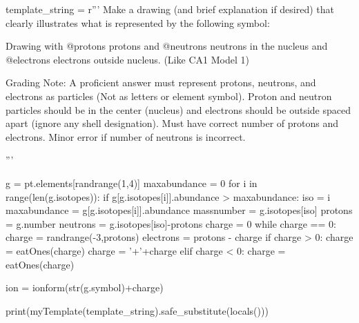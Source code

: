 \begin{pycode}

template_string = r'''
Make a drawing (and brief explanation if desired) that clearly illustrates what is represented by the following symbol: 

\begin{solution}
Drawing with @protons protons and @neutrons neutrons in the nucleus and @electrons electrons outside nucleus. (Like CA1 Model 1) 

\vspace{2\baselineskip}
\ifgradingnotes
Grading Note: A proficient answer must represent protons, neutrons, and electrons as particles (Not as letters or element symbol). Proton and neutron particles should be in the center (nucleus) and electrons should be outside spaced apart (ignore any shell designation). Must have correct number of protons and electrons. Minor error if number of neutrons is incorrect. 
\fi
\end{solution}

'''

g = pt.elements[randrange(1,4)]
maxabundance = 0
for i in range(len(g.isotopes)):
	if g[g.isotopes[i]].abundance > maxabundance:
		iso = i
		maxabundance = g[g.isotopes[i]].abundance
massnumber = g.isotopes[iso]
protons = g.number
neutrons = g.isotopes[iso]-protons
charge = 0
while charge == 0:
	charge = randrange(-3,protons)
electrons = protons - charge
if charge > 0:
	charge = eatOnes(charge)
	charge = '+'+charge
elif charge < 0: 
	charge = eatOnes(charge)

ion = ionform(str(g.symbol)+charge)

print(myTemplate(template_string).safe_substitute(locals()))
	
\end{pycode}


